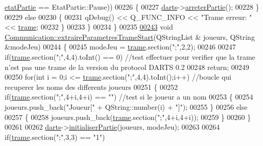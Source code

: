 \begin{DoxyCode}
      \hyperlink{class_communication_a2539ded2780db2c732690c585c768c96}{etatPartie} == EtatPartie::Pause))  
00226         \{
00227             \hyperlink{class_communication_a494d609c206472041468e362d7cfc0e5}{darts}->\hyperlink{class_darts_aa9685f754172d995cdd04d39d9651227}{arreterPartie}();
00228         \}
00229         \textcolor{keywordflow}{else}
00230         \{
00231             qDebug() << Q\_FUNC\_INFO << \textcolor{stringliteral}{"Trame erreur: "} << \hyperlink{class_communication_ac8f5004bfaaf7f538ba5ae93255f772b}{trame};
00232         \}
00233     \}
00234 \}
00235 
\hyperlink{class_communication_a31f998e3410e7a1d9e65a05a5d51a9b9}{00243} \textcolor{keywordtype}{void} \hyperlink{class_communication_a31f998e3410e7a1d9e65a05a5d51a9b9}{Communication::extraireParametresTrameStart}(QStringList &
      joueurs, QString &modeJeu)
00244 \{
00245     modeJeu = \hyperlink{class_communication_ac8f5004bfaaf7f538ba5ae93255f772b}{trame}.section(\textcolor{stringliteral}{";"},2,2);
00246 
00247     \textcolor{keywordflow}{if}(\hyperlink{class_communication_ac8f5004bfaaf7f538ba5ae93255f772b}{trame}.section(\textcolor{stringliteral}{";"},4,4).toInt() == 0) \textcolor{comment}{//test effectuer pour verifier que la trame n'est pas une
       trame de la version du protocol DARTS 0.2}
00248         \textcolor{keywordflow}{return};
00249 
00250     \textcolor{keywordflow}{for}(\textcolor{keywordtype}{int} i = 0;i <= \hyperlink{class_communication_ac8f5004bfaaf7f538ba5ae93255f772b}{trame}.section(\textcolor{stringliteral}{";"},4,4).toInt();i++)  \textcolor{comment}{//boucle qui recuperer les noms des
       differents joueurs}
00251     \{
00252         \textcolor{keywordflow}{if}(\hyperlink{class_communication_ac8f5004bfaaf7f538ba5ae93255f772b}{trame}.section(\textcolor{stringliteral}{";"},4+i,4+i) == \textcolor{stringliteral}{""})    \textcolor{comment}{//test si le joueur a un nom}
00253         \{
00254             joueurs.push\_back(\textcolor{stringliteral}{"Joueur["} + QString::number(i) + \textcolor{stringliteral}{"]"});
00255         \}
00256         \textcolor{keywordflow}{else}
00257         \{
00258             joueurs.push\_back(\hyperlink{class_communication_ac8f5004bfaaf7f538ba5ae93255f772b}{trame}.section(\textcolor{stringliteral}{";"},4+i,4+i));
00259         \}
00260     \}
00261 
00262     \hyperlink{class_communication_a494d609c206472041468e362d7cfc0e5}{darts}->\hyperlink{class_darts_ac7000897b8d394c3be39804813a39dc8}{initialiserPartie}(joueurs, modeJeu);
00263 
00264     \textcolor{keywordflow}{if}(\hyperlink{class_communication_ac8f5004bfaaf7f538ba5ae93255f772b}{trame}.section(\textcolor{stringliteral}{";"},3,3) == \textcolor{stringliteral}{"1"})

\end{DoxyCode}
